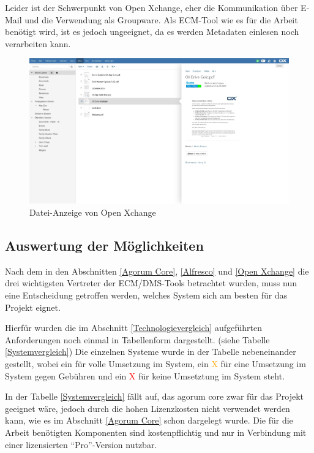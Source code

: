 Leider ist der Schwerpunkt von Open Xchange, eher die Kommunikation \"uber E-Mail und die Verwendung als Groupware. Als \ac{ECM}-Tool wie es f\"ur die Arbeit ben\"otigt wird, ist es jedoch ungeeignet, da es werden Metadaten einlesen noch verarbeiten kann.

\begin{figure}[!ht]
\centering
\includegraphics[width=16cm]{Bilder/xchange_Oberflaeche.jpg}
\caption{Datei-Anzeige von Open Xchange}
\label{Xchange Dateianzeige}
\centering
\end{figure}

\FloatBarrier
\subsection{Auswertung der M\"oglichkeiten}\label{Auswertung ECM}
Nach dem in den Abschnitten \ref{Agorum Core}, \ref{Alfresco} und \ref{Open Xchange} die drei wichtigsten Vertreter der \ac{ECM}/\ac{DMS}-Tools
betrachtet wurden, muss nun eine Entscheidung getroffen werden, welches System sich am besten f\"ur das Projekt eignet.

Hierf\"ur wurden die im Abschnitt \ref{Technologievergleich} aufgef\"uhrten Anforderungen noch einmal in Tabellenform dargestellt. (siehe Tabelle \ref{Systemvergleich}) Die einzelnen Systeme wurde in der Tabelle nebeneinander gestellt, wobei ein \textcolor{green}{\checkmark} f\"ur volle Umsetzung im System, ein \textcolor{orange}{\checkmark X} f\"ur eine Umsetzung im System gegen Geb\"uhren und ein \textcolor{red}{X} f\"ur keine Umsetztung im System steht.

In der Tabelle \ref{Systemvergleich} f\"allt auf, das agorum core zwar f\"ur das Projekt geeignet w\"are, jedoch durch die hohen Lizenzkosten nicht verwendet werden kann, wie es im Abschnitt \ref{Agorum Core} schon dargelegt wurde. Die f\"ur die Arbeit ben\"otigten Komponenten sind kostenpflichtig und nur in Verbindung mit einer lizensierten "`Pro"'-Version nutzbar.


